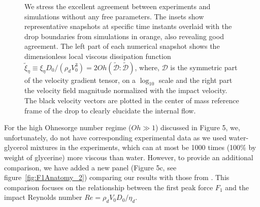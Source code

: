 \documentclass[]{article}
\begin{document}
\begin{enumerate}
\begin{figure}
{{			We stress the excellent agreement between experiments and simulations without any free parameters. The insets show representative snapshots at specific time instants overlaid with the drop boundaries from simulations in orange, also revealing good agreement. 
			The left part of each numerical snapshot shows the dimensionless local viscous dissipation function $\tilde{\xi}_\eta \equiv \xi_\eta D_0/\left(\rho_dV_0^3\right) = 2Oh\left(\boldsymbol{\tilde{\mathcal{D}}:\tilde{\mathcal{D}}}\right)$, where, $\boldsymbol{\mathcal{D}}$ is the symmetric part of the velocity gradient tensor, on a $\log_{10}$ scale and the right part the velocity field magnitude normalized with the impact velocity. The black velocity vectors are plotted in the center of mass reference frame of the drop to clearly elucidate the internal flow.}}
		\label{fig:summary}
	\end{figure}
	
	For the high Ohnesorge number regime ($Oh \gg 1$) discussed in Figure 5, we, unfortunately, do not have corresponding experimental data as we used water-glycerol mixtures in the experiments, which can at most be 1000 times (100\% by weight of glycerine) more viscous than water. However, to provide an additional comparison, we have added a new panel (Figure 5c, see figure~\ref{fig:F1Anatomy_2}) comparing our results with those from \citet{Gordillo2018, cheng2021drop}. This comparison focuses on the relationship between the first peak force $F_1$ and the impact Reynolds number $Re = \rho_dV_0D_0/\eta_d$.
	

\end{enumerate}
\end{document}

